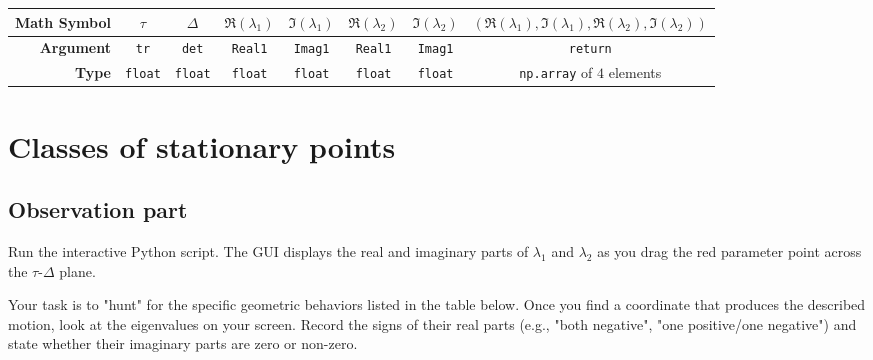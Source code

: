 \documentclass[11pt]{article}
\begin{document}
\begin{center}
\renewcommand{\arraystretch}{2.0}
\begin{tabular}{r | c | c | c | c | c | c | c}
\toprule
\textbf{Math Symbol} & $\tau$ & $\Delta$ & $\Re(\lambda_1)$ & $\Im(\lambda_1)$ & $\Re(\lambda_2)$ & $\Im(\lambda_2)$ & $(\Re(\lambda_1), \Im(\lambda_1), \Re(\lambda_2), \Im(\lambda_2))$ \\ \midrule
\textbf{Argument} & \lstinline|tr| & \lstinline|det| & \lstinline|Real1| & \lstinline|Imag1| & \lstinline|Real1| & \lstinline|Imag1| & \lstinline|return| \\ \midrule
\textbf{Type} & \lstinline|float| & \lstinline|float| & \lstinline|float| & \lstinline|float| & \lstinline|float| & \lstinline|float| & \lstinline|np.array| of $4$ elements \\
\bottomrule
\end{tabular}
\end{center}



\section*{Classes of stationary points}

\subsection*{Observation part}

Run the interactive Python script. The GUI displays the real and imaginary parts of $\lambda_1$ and $\lambda_2$ as you drag the red parameter point across the $\tau$-$\Delta$ plane.


Your task is to "hunt" for the specific geometric behaviors listed in the table below. Once you find a coordinate that produces the described motion, look at the eigenvalues on your screen. Record the signs of their real parts (e.g., "both negative", "one positive/one negative") and state whether their imaginary parts are zero or non-zero.
\end{document}
